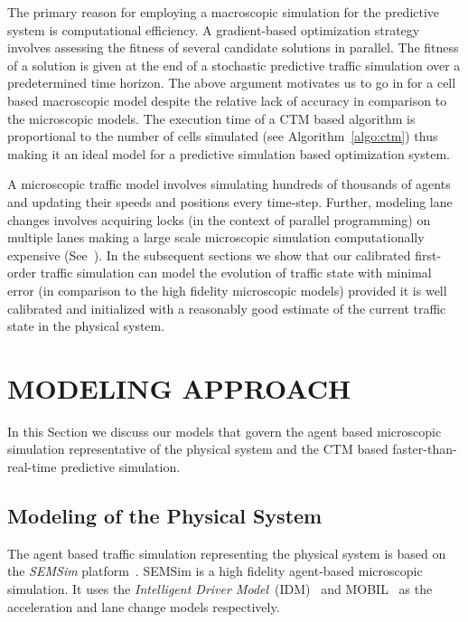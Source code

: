 \documentclass{wscpaperproc}
\theoremstyle{wsc}
\begin{document}
The primary reason for employing a macroscopic simulation for the predictive system  is computational efficiency. A gradient-based optimization strategy involves assessing the fitness of several candidate solutions in parallel. The fitness of a solution is given at the end of a stochastic predictive traffic simulation over a predetermined time horizon.  The above argument motivates us to go in for a cell based macroscopic model despite the relative lack of accuracy in comparison to the microscopic models. The execution time of a CTM based algorithm is proportional to the number of cells simulated (see Algorithm~\ref{algo:ctm}) thus making it an ideal model for a predictive simulation based optimization system.

A microscopic traffic model involves simulating hundreds of thousands of agents and updating their speeds and positions every time-step. Further, modeling lane changes involves acquiring locks (in the context of parallel programming) on multiple lanes making a large scale microscopic simulation computationally expensive (See~\cite{aydt2013multi}). In the subsequent sections we show that our calibrated first-order traffic simulation can model the evolution of traffic state with minimal error (in comparison to the high fidelity microscopic models) provided it is well calibrated and initialized with a reasonably good estimate of the current traffic state in the physical system. 
  
  
 \section{MODELING APPROACH} 
 \label{sec:modelling}
 In this Section we discuss our models that govern the agent based microscopic simulation representative of the physical system and the CTM based faster-than-real-time predictive simulation. 
 
 
\subsection{Modeling of the Physical System}

The agent based traffic simulation representing the physical system is based on the {\it SEMSim} platform~. SEMSim is a high fidelity agent-based microscopic simulation. It uses the {\it Intelligent Driver Model}~(IDM)~ and MOBIL~ as the acceleration and lane change models respectively.
\end{document}
